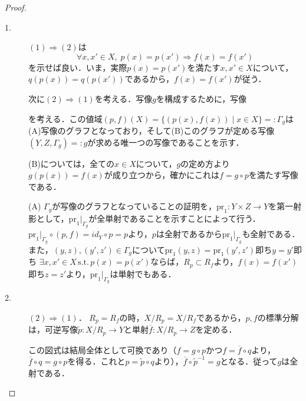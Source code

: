 \documentclass[uplatex,dvipdfmx]{jsreport}
\begin{document}
\begin{proof}
    \begin{description}
        \item[1. ] $(1)\Rightarrow (2)$は\[ \forall x,x'\in X ,\; p(x)=p(x')\Rightarrow f(x)=f(x') \]を示せば良い．いま，実際$p(x)=p(x')$を満たす$x,x'\in X$について，$q(p(x))=q(p(x'))$であるから，$f(x)=f(x')$が従う．

        次に$(2)\Rightarrow (1)$を考える．写像$g$を構成するために，写像
        \begin{center}\end{center}
        を考える．この値域$(p,f)(X)=\{ (p(x),f(x))\mid x\in X \}=:\Gamma_g$は(A)写像のグラフとなっており，そして(B)このグラフが定める写像$(Y,Z,\Gamma_g)=:g$が求める唯一つの写像であることを示す．
    
        (B)については，全ての$x\in X$について，$g$の定め方より$g(p(x))=f(x)$が成り立つから，確かにこれは$f=g\circ p$を満たす写像である．
    
        (A) $\Gamma_g$が写像のグラフとなっていることの証明を，$\mathrm{pr}_1:Y\times Z\to Y$を第一射影として，$\mathrm{pr}_1|_{\Gamma_g}$が全単射であることを示すことによって行う．
        $\mathrm{pr}_1|_{\Gamma_g}\circ (p,f)=id_Y\circ p=p$より，$p$は全射であるから$\mathrm{pr}_1|_{\Gamma_g}$も全射である．また，$(y,z),(y',z')\in\Gamma_g$について$\mathrm{pr}_1(y,z)=\mathrm{pr}_1(y',z')$即ち$y=y'$即ち
        $\exists x,x'\in X \,\mathrm{s.t.}\, p(x)=p(x')$ならば，$R_p\subset R_f$より，$f(x)=f(x')$即ち$z=z'$より，$\mathrm{pr}_1|_{\Gamma_g}$は単射でもある．
        \item[2. ] $(2)\Rightarrow(1)$． $R_p=R_f$の時，$X/R_p=X/R_f$であるから，$p,f$の標準分解は，可逆写像$\tilde{p}:X/R_p\to Y$と単射$\overline{f}:X/R_p\to Z$を定める．
        \begin{center}\end{center}
        この図式は結局全体として可換であり（$f=g\circ p$かつ$f=\overline{f}\circ q$より，$\overline{f}\circ q=g\circ p$を得る．これと$p=\tilde{p}\circ q$より），$\overline{f}\circ\tilde{p}^{-1}=g$となる．従って$g$は全射である．
    

\end{description}
\end{proof}
\end{document}
